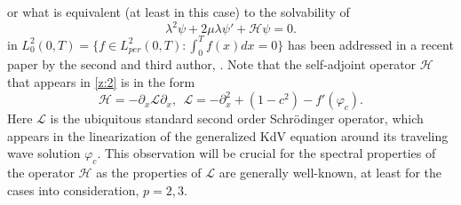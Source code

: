\documentclass[final,11pt,leqno]{amsart}
\begin{document}
 or what is equivalent (at least in this case) to the solvability  of
 \begin{equation}
\label{5}
{\lambda}^2\psi+2 \mu {\lambda}\psi'+ {\mathcal H}\psi=0.
\end{equation}
in $L^2_0(0,T)=\{f\in L^2_{per}(0,T): \int_0^T f(x) dx=0\}$
 has been addressed in a recent paper by the second and third author, \cite{SS1}.
 Note that  the self-adjoint  operator  ${\mathcal H}$ that appears in \eqref{z:2}  is in the form
 $$
 {\mathcal H}=-{\partial}_x {\mathcal L} {\partial}_x, \ \ {\mathcal L}=-{\partial}_x^2+(1-c^2)-f'({\varphi}_c).
 $$
 Here ${\mathcal L}$ is the ubiquitous  standard second order Schr\"odinger operator, which appears in the linearization of the generalized KdV equation around
 its traveling wave solution ${\varphi}_c$. This observation will be crucial for the spectral properties of the operator ${\mathcal H}$ as the properties of ${\mathcal L}$ are
 generally well-known, at least for the cases into consideration, $p=2,3$.
\end{document}

